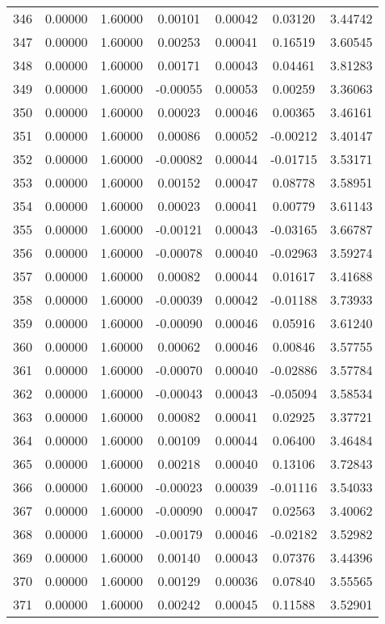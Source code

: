 \begin{longtable}{c c c c c c c}
346 &  0.00000 &      1.60000 &  0.00101 &   0.00042 &   0.03120 &   3.44742 \\
347 &  0.00000 &      1.60000 &  0.00253 &   0.00041 &   0.16519 &   3.60545 \\
348 &  0.00000 &      1.60000 &  0.00171 &   0.00043 &   0.04461 &   3.81283 \\
349 &  0.00000 &      1.60000 & -0.00055 &   0.00053 &   0.00259 &   3.36063 \\
350 &  0.00000 &      1.60000 &  0.00023 &   0.00046 &   0.00365 &   3.46161 \\
351 &  0.00000 &      1.60000 &  0.00086 &   0.00052 &  -0.00212 &   3.40147 \\
352 &  0.00000 &      1.60000 & -0.00082 &   0.00044 &  -0.01715 &   3.53171 \\
353 &  0.00000 &      1.60000 &  0.00152 &   0.00047 &   0.08778 &   3.58951 \\
354 &  0.00000 &      1.60000 &  0.00023 &   0.00041 &   0.00779 &   3.61143 \\
355 &  0.00000 &      1.60000 & -0.00121 &   0.00043 &  -0.03165 &   3.66787 \\
356 &  0.00000 &      1.60000 & -0.00078 &   0.00040 &  -0.02963 &   3.59274 \\
357 &  0.00000 &      1.60000 &  0.00082 &   0.00044 &   0.01617 &   3.41688 \\
358 &  0.00000 &      1.60000 & -0.00039 &   0.00042 &  -0.01188 &   3.73933 \\
359 &  0.00000 &      1.60000 & -0.00090 &   0.00046 &   0.05916 &   3.61240 \\
360 &  0.00000 &      1.60000 &  0.00062 &   0.00046 &   0.00846 &   3.57755 \\
361 &  0.00000 &      1.60000 & -0.00070 &   0.00040 &  -0.02886 &   3.57784 \\
362 &  0.00000 &      1.60000 & -0.00043 &   0.00043 &  -0.05094 &   3.58534 \\
363 &  0.00000 &      1.60000 &  0.00082 &   0.00041 &   0.02925 &   3.37721 \\
364 &  0.00000 &      1.60000 &  0.00109 &   0.00044 &   0.06400 &   3.46484 \\
365 &  0.00000 &      1.60000 &  0.00218 &   0.00040 &   0.13106 &   3.72843 \\
366 &  0.00000 &      1.60000 & -0.00023 &   0.00039 &  -0.01116 &   3.54033 \\
367 &  0.00000 &      1.60000 & -0.00090 &   0.00047 &   0.02563 &   3.40062 \\
368 &  0.00000 &      1.60000 & -0.00179 &   0.00046 &  -0.02182 &   3.52982 \\
369 &  0.00000 &      1.60000 &  0.00140 &   0.00043 &   0.07376 &   3.44396 \\
370 &  0.00000 &      1.60000 &  0.00129 &   0.00036 &   0.07840 &   3.55565 \\
371 &  0.00000 &      1.60000 &  0.00242 &   0.00045 &   0.11588 &   3.52901 \\
\end{longtable}
